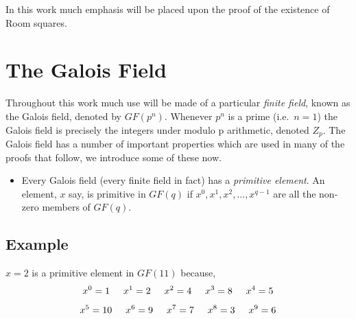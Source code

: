 \documentclass[
  12pt,
  a4paper]{book}
\providecommand{\tightlist}{%
  \setlength{\itemsep}{0pt}\setlength{\parskip}{0pt}}
\begin{document}
In this work much emphasis will be placed upon the proof of the
existence of Room squares.

\hypertarget{the-galois-field}{%
\section{The Galois Field}\label{the-galois-field}}

Throughout this work much use will be made of a particular \emph{finite
field}, known as the Galois field, denoted by \(GF(p^n)\). Whenever \(p^n\)
is a prime (i.e.~\(n=1\)) the Galois field is precisely the integers under
modulo p arithmetic, denoted \(Z_p\). The Galois field has a number of
important properties which are used in many of the proofs that follow,
we introduce some of these now.

\begin{itemize}
\tightlist
\item
  Every Galois field (every finite field in fact) has a \emph{primitive
  element}. An element, \(x\) say, is primitive in \(GF(q)\) if
  \(x^0,x^1,x^2,...,x^{q-1}\) are all the non-zero members of \(GF(q)\).
\end{itemize}

\hypertarget{example}{%
\subsection{Example}\label{example}}

\(x=2\) is a primitive element in \(GF(11)\) because,
\[x^0 = 1 \hspace{0.5cm} x^1 = 2 \hspace{0.5cm} x^2 = 4 \hspace{0.5cm} x^3 = 8 \hspace{0.5cm} x^4 = 5\]
\[x^5 = 10 \hspace{0.5cm} x^6 = 9 \hspace{0.5cm} x^7 = 7 \hspace{0.5cm} x^8 = 3 \hspace{0.5cm} x^9 = 6\]
\end{document}
